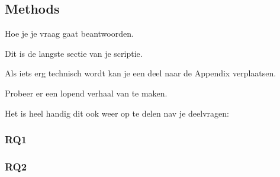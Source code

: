 \pagebreak
\subsection{Methods}
Hoe je je vraag gaat beantwoorden.


Dit is de langste sectie van je scriptie. 

Als iets erg technisch wordt kan je een deel naar de Appendix verplaatsen. 

Probeer er een lopend verhaal van te maken.

Het is heel handig dit ook weer op te delen nav je deelvragen:

\subsubsection{RQ1}

\subsubsection{RQ2}